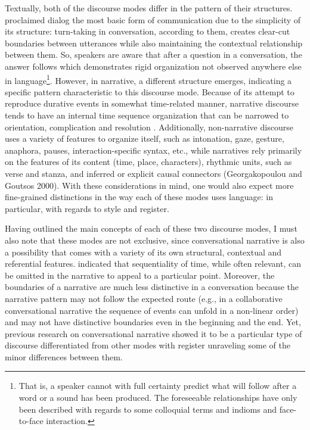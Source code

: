 \documentclass[12pt, draft]{article}
\begin{document}
Textually, both of the discourse modes differ in the pattern of their structures. \textcite{bakhtin1986} proclaimed dialog the most basic form of communication due to the simplicity of its structure: turn-taking in conversation, according to them, creates clear-cut boundaries between utterances while also maintaining the contextual relationship between them. So, speakers are aware that after a question in a conversation, the answer follows which demonstrates rigid organization not observed anywhere else in language\footnote{That is, a speaker cannot with full certainty predict what will follow after a word or a sound has been produced. The foreseeable relationships have only been described with regards to some colloquial terms and indioms and face-to-face interaction.}. However, in  narrative, a different structure emerges, indicating a specific pattern characteristic to this discourse mode. Because of its attempt to reproduce durative events in somewhat time-related manner, narrative discourse tends to have an internal time sequence organization that can be narrowed to orientation, complication and resolution \parencite{labov1967}. Additionally, non-narrative discourse uses a variety of features to organize itself, such as intonation, gaze, gesture, anaphora, pauses, interaction-specific syntax, etc., while narratives rely primarily on the features of its content (time, place, characters), rhythmic units, such as verse and stanza, and inferred or explicit causal connectors (Georgakopoulou and Goutsos 2000). With these considerations in mind, one would also expect more fine-grained distinctions in the way each of these modes uses language: in particular, with regards to style and register. 

Having outlined the main concepts of each of these two discourse modes, I must also note that these modes are not exclusive, since conversational narrative is also a possibility that comes with a variety of its own structural, contextual and referential features. \textcite{norrick2000} indicated that sequentiality of time, while often relevant, can be omitted in the narrative to appeal to a particular point. Moreover, the boundaries of a narrative are much less distinctive in a conversation because the narrative pattern may not follow the expected route (e.g., in a collaborative conversational narrative the sequence of events can unfold in a non-linear order) and may not have distinctive boundaries even in the beginning and the end. Yet, previous research on conversational narrative showed it to be a particular type of discourse differentiated from other modes with register unraveling some of the minor differences between them.
\end{document}
